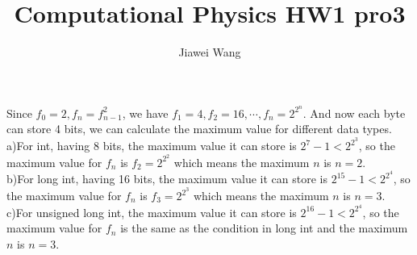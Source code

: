 \documentclass[a4paper,12pt]{article}
\begin{document}
\title{Computational Physics HW1 pro3}
\author{Jiawei Wang}
\date{}
\maketitle

\noindent Since $f_0=2, f_n=f_{n-1}^2$, we have $f_1=4, f_2=16, \cdots, f_n=2^{2^n}$. And now each byte can store 4 bits, we can calculate the maximum value for different data types.\\
a)For int, having 8 bits, the maximum value it can store is $2^7-1<2^{2^3}$, so the maximum value for $f_n$ is $f_2=2^{2^2}$ which means the maximum $n$ is $n=2$.\\
b)For long int, having 16 bits, the maximum value it can store is $2^{15}-1<2^{2^4}$, so the maximum value for $f_n$ is $f_3=2^{2^3}$ which means the maximum $n$ is $n=3$.\\
c)For unsigned long int, the maximum value it can store is $2^{16}-1<2^{2^4}$, so the maximum value for $f_n$ is the same as the condition in long int and the maximum $n$ is $n=3$.
\end{document}
